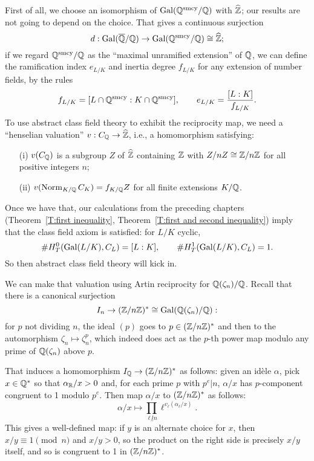 
First of all, we choose an isomorphism of $\operatorname{Gal}(\mathbb{Q}^{\operatorname{smcy}}/\mathbb{Q})$
with $\widehat{\mathbb{Z}}$; our results are not going to depend on the choice.
That gives a continuous surjection
\[
d: \operatorname{Gal}(\overline{\mathbb{Q}}/\mathbb{Q}) \to \operatorname{Gal}(\mathbb{Q}^{\operatorname{smcy}}/\mathbb{Q}) \cong \widehat{\mathbb{Z}};
\]
if we regard $\mathbb{Q}^{\operatorname{smcy}}/\mathbb{Q}$ as the ``maximal unramified extension''
of $\mathbb{Q}$, we can define the ramification index $e_{L/K}$ and inertia
degree $f_{L/K}$ for any extension of number fields, by the rules
\[
f_{L/K} = [L \cap \mathbb{Q}^{\operatorname{smcy}}:K \cap \mathbb{Q}^{\operatorname{smcy}}], \qquad
e_{L/K} = \frac{[L:K]}{f_{L/K}}.
\]
To use abstract class field theory to exhibit the reciprocity map, we
need a ``henselian valuation'' $v: C_{\mathbb{Q}} \to \widehat{\mathbb{Z}}$,
i.e., a homomorphism satisfying:
\begin{enumerate}
\item[(i)]
$v(C_{\mathbb{Q}})$ is a subgroup $Z$ of $\widehat{\mathbb{Z}}$ containing $\mathbb{Z}$
with $Z/nZ \cong \mathbb{Z}/n\mathbb{Z}$ for all positive integers $n$;
\item[(ii)]
$v(\operatorname{Norm}_{K/\mathbb{Q}} C_K) = f_{K/\mathbb{Q}} Z$ for all finite extensions $K/\mathbb{Q}$.
\end{enumerate}
Once we have that, our calculations from the preceding chapters
(Theorem~\ref{T:first inequality}, Theorem~\ref{T:first and second inequality}) imply
that the class field axiom is satisfied: for $L/K$ cyclic,
\[
\#H^0_T(\operatorname{Gal}(L/K), C_L) = [L:K], \qquad
\#H^1_T(\operatorname{Gal}(L/K), C_L) = 1.
\]
So then abstract class field theory will kick in.

We can make that valuation using Artin reciprocity for $\mathbb{Q}(\zeta_n)/\mathbb{Q}$.
Recall that there is a canonical surjection
\[
I_n \to (\mathbb{Z}/n\mathbb{Z})^* \cong \operatorname{Gal}(\mathbb{Q}(\zeta_n)/\mathbb{Q}):
\]
for $p$ not dividing $n$, the ideal $(p)$ goes to $p \in (\mathbb{Z}/n\mathbb{Z})^*$
and then to the automorphism $\zeta_n \mapsto \zeta_n^p$, which indeed
does act as the $p$-th power map modulo any prime of $\mathbb{Q}(\zeta_n)$
above $p$.

That induces a homomorphism $I_{\mathbb{Q}} \to (\mathbb{Z}/n\mathbb{Z})^*$ as follows:
given an id\`ele $\alpha$, pick $x \in \mathbb{Q}^*$ so that
$\alpha_{\mathbb{R}}/x > 0$ and, for each prime
$p$ with $p^e | n$, $\alpha/x$ has $p$-component congruent to 1
modulo $p^e$. Then map $\alpha/x$ to $(\mathbb{Z}/n\mathbb{Z})^*$ as follows:
\[
\alpha/x \mapsto \prod_{\ell \not| n} \ell^{v_{\ell}(\alpha_{\ell}/x)}.
\]
This gives a well-defined map:
if $y$ is an alternate choice for $x$, then $x/y \equiv 1 \pmod{n}$
and $x/y > 0$, so the product on the right side is precisely $x/y$ itself,
and so is congruent to 1 in $(\mathbb{Z}/n\mathbb{Z})^*$.

